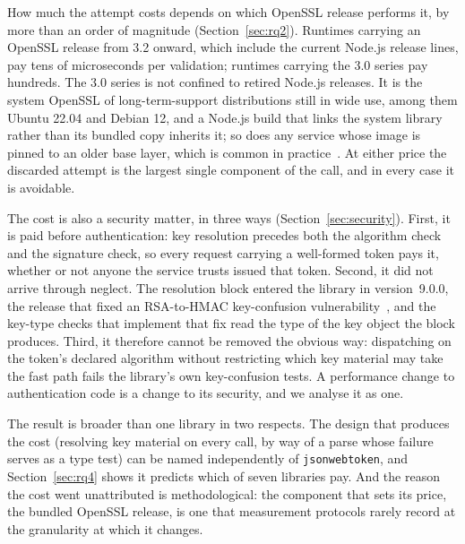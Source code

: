 \documentclass[preprint,12pt,authoryear]{elsarticle}
\newcommand{\LibraryName}{\texttt{jsonwebtoken}}
\begin{document}
How much the attempt costs depends on which OpenSSL release performs it, by more
than an order of magnitude (Section~\ref{sec:rq2}). Runtimes carrying an OpenSSL
release from 3.2 onward, which include the current Node.js release lines, pay
tens of microseconds per validation; runtimes carrying the 3.0 series pay
hundreds. The 3.0 series is not confined to retired Node.js releases. It is the
system OpenSSL of long-term-support distributions still in wide use, among them
Ubuntu 22.04 and Debian 12, and a Node.js build that links the system library
rather than its bundled copy inherits it; so does any service whose image is
pinned to an older base layer, which is common in
practice~\citep{zerouali2019outdated}. At either price the discarded attempt is
the largest single component of the call, and in every case it is avoidable.

The cost is also a security matter, in three ways
(Section~\ref{sec:security}). First, it is paid before authentication: key
resolution precedes both the algorithm check and the signature check, so every
request carrying a well-formed token pays it, whether or not anyone the
service trusts issued that token. Second, it did not arrive through neglect.
The resolution block entered the library in version~9.0.0, the release that
fixed an RSA-to-HMAC key-confusion vulnerability~\citep{auth0bulletin2022},
and the key-type checks that implement that fix read the type of the key
object the block produces. Third, it therefore cannot be removed the obvious
way: dispatching on the token's declared algorithm without restricting which
key material may take the fast path fails the library's own key-confusion
tests. A performance change to authentication code is a change to its
security, and we analyse it as one.

The result is broader than one library in two respects. The design that
produces the cost (resolving key material on every call, by way of a parse
whose failure serves as a type test) can be named independently of
\LibraryName{}, and Section~\ref{sec:rq4} shows it predicts which of seven
libraries pay. And the reason the cost went unattributed is methodological: the
component that sets its price, the bundled OpenSSL release, is one that
measurement protocols rarely record at the granularity at which it changes.
\end{document}
